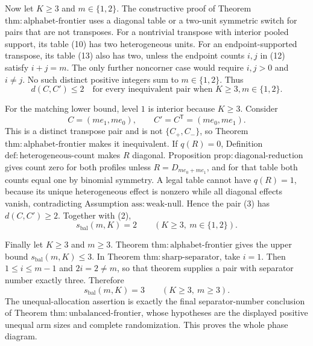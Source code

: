 Now let \(K\geq3\) and \(m\in\{1,2\}\). The constructive proof of Theorem \(\mathrm{thm{:}alphabet\text{-}frontier}\) uses a diagonal table or a two-unit symmetric switch for pairs that are not transposes. For a nontrivial transpose with interior pooled support, its table (10) has two heterogeneous units. For an endpoint-supported transpose, its table (13) also has two, unless the endpoint counts \(i,j\) in (12) satisfy \(i+j=m\). The only further noncorner case would require \(i,j>0\) and \(i\neq j\). No such distinct positive integers sum to \(m\in\{1,2\}\). Thus
\[
 d(C,C')\leq2
 \quad\text{for every inequivalent pair when }K\geq3, m\in\{1,2\}.
 \tag{2}
\]

For the matching lower bound, level \(1\) is interior because \(K\geq3\). Consider
\[
 C=(me_1,me_0),\qquad C'=C^{\mathsf T}=(me_0,me_1).
 \tag{3}
\]
This is a distinct transpose pair and is not \(\{C_+,C_-\}\), so Theorem \(\mathrm{thm{:}alphabet\text{-}frontier}\) makes it inequivalent. If \(q(R)=0\), Definition \(\mathrm{def{:}heterogeneous\text{-}count}\) makes \(R\) diagonal. Proposition \(\mathrm{prop{:}diagonal\text{-}reduction}\) gives count zero for both profiles unless \(R=D_{me_0+me_1}\), and for that table both counts equal one by binomial symmetry. A legal table cannot have \(q(R)=1\), because its unique heterogeneous effect is nonzero while all diagonal effects vanish, contradicting Assumption \(\mathrm{ass{:}weak\text{-}null}\). Hence the pair (3) has \(d(C,C')\geq2\). Together with (2),
\[
 s_{\mathrm{bal}}(m,K)=2
 \qquad(K\geq3,\ m\in\{1,2\}).
 \tag{4}
\]

Finally let \(K\geq3\) and \(m\geq3\). Theorem \(\mathrm{thm{:}alphabet\text{-}frontier}\) gives the upper bound \(s_{\mathrm{bal}}(m,K)\leq3\). In Theorem \(\mathrm{thm{:}sharp\text{-}separator}\), take \(i=1\). Then \(1\leq i\leq m-1\) and \(2i=2\neq m\), so that theorem supplies a pair with separator number exactly three. Therefore
\[
 s_{\mathrm{bal}}(m,K)=3
 \qquad(K\geq3,\ m\geq3).
 \tag{5}
\]
The unequal-allocation assertion is exactly the final separator-number conclusion of Theorem \(\mathrm{thm{:}unbalanced\text{-}frontier}\), whose hypotheses are the displayed positive unequal arm sizes and complete randomization. This proves the whole phase diagram.
